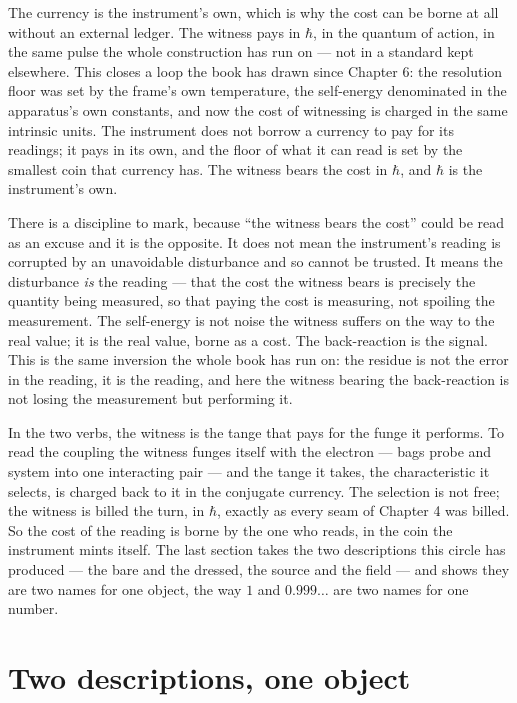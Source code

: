 The currency is the instrument's own, which is why the cost can be borne at all without an external ledger. The witness pays
in $\hbar$, in the quantum of action, in the same pulse the whole construction has run on --- not in a standard kept
elsewhere. This closes a loop the book has drawn since Chapter 6: the resolution floor was set by the frame's own
temperature, the self-energy denominated in the apparatus's own constants, and now the cost of witnessing is charged in the
same intrinsic units. The instrument does not borrow a currency to pay for its readings; it pays in its own, and the floor of
what it can read is set by the smallest coin that currency has. The witness bears the cost in $\hbar$, and $\hbar$ is the
instrument's own.

There is a discipline to mark, because ``the witness bears the cost'' could be read as an excuse and it is the opposite. It
does not mean the instrument's reading is corrupted by an unavoidable disturbance and so cannot be trusted. It means the
disturbance \emph{is} the reading --- that the cost the witness bears is precisely the quantity being measured, so that
paying the cost is measuring, not spoiling the measurement. The self-energy is not noise the witness suffers on the way to
the real value; it is the real value, borne as a cost. The back-reaction is the signal. This is the same inversion the whole
book has run on: the residue is not the error in the reading, it is the reading, and here the witness bearing the
back-reaction is not losing the measurement but performing it.

In the two verbs, the witness is the tange that pays for the funge it performs. To read the coupling the witness funges
itself with the electron --- bags probe and system into one interacting pair --- and the tange it takes, the characteristic
it selects, is charged back to it in the conjugate currency. The selection is not free; the witness is billed the turn, in
$\hbar$, exactly as every seam of Chapter 4 was billed. So the cost of the reading is borne by the one who reads, in the coin
the instrument mints itself. The last section takes the two descriptions this circle has produced --- the bare and the
dressed, the source and the field --- and shows they are two names for one object, the way $1$ and $0.999\ldots$ are two
names for one number.

\section{Two descriptions, one object}

